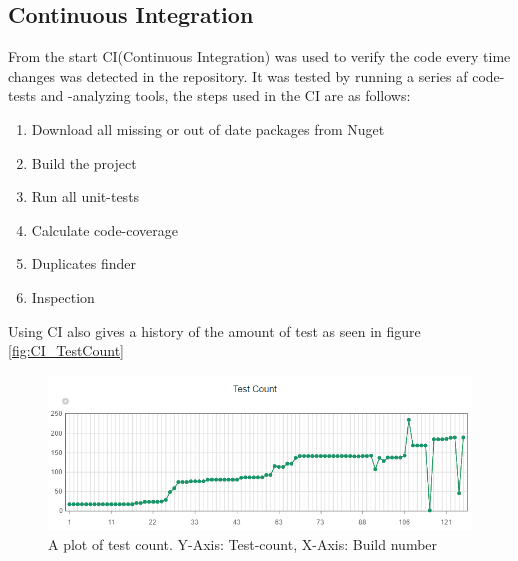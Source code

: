 \subsection{Continuous Integration}

From the start CI(Continuous Integration) was used to verify the code every time changes was detected in the repository. It was tested by running a series af code-tests and -analyzing tools, the steps used in the CI are as follows:

\begin{enumerate}
	\item Download all missing or out of date packages from Nuget
	\item Build the project
	\item Run all unit-tests
	\item Calculate code-coverage
	\item Duplicates finder
	\item Inspection
\end{enumerate}

Using CI also gives a history of the amount of test as seen in figure \vref{fig:CI_TestCount}

\begin{figure}[H]
\centering
\includegraphics[width=0.95\linewidth]{SubPages/Images/CI_TestCount}
\caption{A plot of test count. Y-Axis: Test-count, X-Axis: Build number}
\label{fig:CI_TestCount}
\end{figure}
